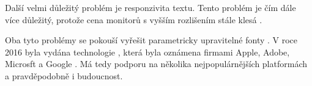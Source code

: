 \documentclass[a4paper, 11pt]{article}
\begin{document}
Další velmi důležitý problém je responzivita textu. Tento problém je čím dále více důležitý, protože cena monitorů s vyšším rozlišením stále klesá \cite{pamental2014responsive}.

Oba tyto problémy se pokouší vyřešit parametricky upravitelné fonty \cite{920629}. V roce 2016 byla vydána technologie , která byla oznámena firmami Apple, Adobe, Microsft a Google \cite{marlene2017thesis}. Má tedy podporu na několika nejpopulárnějších platformách a pravděpodobně i budoucnost. 

\newpage

\end{document}
